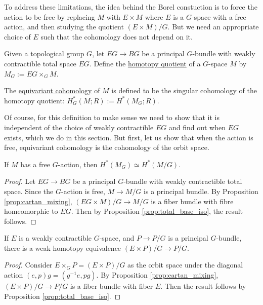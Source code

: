To address these limitations, the idea behind the Borel constuction is to force 
the action to be free by replacing  $M$ with  $E\times M$ where $E$ is a  
$G$-space with a free action, and then studying the quotient  $(E\times M) /G$. 
But we need an appropriate choice of $E$ such that the cohomology does not 
depend on it.

\begin{defn}
	Given a topological group $G$, let  $EG \to BG$ be a principal  $G$-bundle
	with weakly contractible total space  $EG$. Define the  \underline{homotopy
	quotient} of a $G$-space $M$ by $M_G:=EG\times_G M$.
	 
	The \underline{equivariant cohomology} of $M$ is defined to be the singular
	cohomology of the homotopy quotient: $H_G^*(M;R) := H^*(M_G;R)$.
\end{defn}
Of course, for this definition to make sense we need to show that it is
independent of the choice of weakly contractible $EG$ and find out when $EG$ 
exists, which we do in this section. But first, let us show that when the action 
is free, equivariant cohomology is the cohomology of the orbit space.
\begin{prop} \label{prop:free_action_cohomology}
	If $M$ has a free  $G$-action, then $H^*(M_G)\simeq H^*(M /G)$. 
\end{prop}
\begin{proof}
	Let $EG \to BG$ be a principal  $G$-bundle with weakly contractible total
	space. Since the $G$-action is free,  $M \to M /G$ is a principal bundle.
	By Proposition \ref{prop:cartan_mixing}, 
	$(EG\times M) /G \to M /G$ is a fiber bundle with
	fibre homeomorphic to $EG$. Then by Proposition \ref{prop:total_base_iso},
	the result follows.
\end{proof}

\begin{lem} %
	If $E$ is a weakly contractible $G$-space, and $P\to P/G$ is a principal
	$G$-bundle, there is a weak homotopy equivalence $(E\times P) /G \to P /G$.  
\end{lem}
\begin{proof}
	Consider $E\times_G P = (E\times P) /G$ as the orbit space under 
	the diagonal action $(e,p)g = (g^{-1}e,pg)$. 
	By Proposition \ref{prop:cartan_mixing}, $(E\times P) /G \to P /G$ is a
	fiber bundle with fiber $E$. Then the result follows by Proposition
	\ref{prop:total_base_iso}.
\end{proof}

